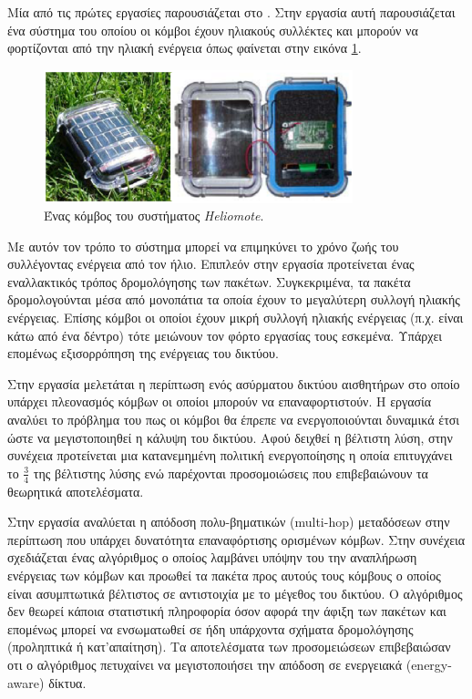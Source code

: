 Μία από τις πρώτες εργασίες παρουσιάζεται στο \cite{heliomote}. Στην εργασία αυτή παρουσιάζεται ένα σύστημα του οποίου οι κόμβοι έχουν ηλιακούς συλλέκτες
και μπορούν να φορτίζονται από την ηλιακή ενέργεια όπως φαίνεται στην εικόνα \ref{fig:heliomote_example}.
\begin{figure}[h]
	\centering
	\includegraphics[width=0.8\textwidth]{images/heliomote_example.eps}
	\caption{Ένας κόμβος του συστήματος \textit{Heliomote}.}
	\label{fig:heliomote_example}
\end{figure}
Με αυτόν τον τρόπο το σύστημα μπορεί να επιμηκύνει το χρόνο ζωής του συλλέγοντας ενέργεια από τον ήλιο. Επιπλεόν στην εργασία προτείνεται ένας εναλλακτικός τρόπος
δρομολόγησης των πακέτων. Συγκεκριμένα, τα πακέτα δρομολογούνται μέσα από μονοπάτια τα οποία έχουν το μεγαλύτερη συλλογή ηλιακής ενέργειας. Επίσης κόμβοι οι οποίοι
έχουν μικρή συλλογή ηλιακής ενέργειας (π.χ. είναι κάτω από ένα δέντρο) τότε μειώνουν τον φόρτο εργασίας τους εσκεμένα. Υπάρχει επομένως εξισορρόπηση της ενέργειας
του δικτύου.

Στην εργασία \cite{harvesting_6} μελετάται η περίπτωση ενός ασύρματου δικτύου αισθητήρων στο οποίο υπάρχει πλεονασμός κόμβων οι οποίοι μπορούν να
επαναφορτιστούν. Η εργασία αναλύει το πρόβλημα του πως οι κόμβοι θα έπρεπε να ενεργοποιούνται δυναμικά έτσι ώστε να μεγιστοποιηθεί η κάλυψη του δικτύου. Αφού δειχθεί
η βέλτιστη λύση, στην συνέχεια προτείνεται μια κατανεμημένη πολιτική ενεργοποίησης η οποία επιτυγχάνει το $\frac{3}{4}$ της βέλτιστης λύσης ενώ παρέχονται
προσομοιώσεις που επιβεβαιώνουν τα θεωρητικά αποτελέσματα.

Στην εργασία \cite{harvesting_7} αναλύεται η απόδοση πολυ-βηματικών (multi-hop) μεταδόσεων στην περίπτωση που υπάρχει δυνατότητα επαναφόρτισης ορισμένων κόμβων. Στην
συνέχεια σχεδιάζεται ένας αλγόριθμος ο οποίος λαμβάνει υπόψην του την αναπλήρωση ενέργειας των κόμβων και προωθεί τα πακέτα προς αυτούς τους κόμβους ο οποίος είναι
ασυμπτωτικά βέλτιστος σε αντιστοιχία με το μέγεθος του δικτύου. Ο αλγόριθμος δεν θεωρεί κάποια στατιστική πληροφορία όσον αφορά την άφιξη των πακέτων και επομένως
μπορεί να ενσωματωθεί σε ήδη υπάρχοντα σχήματα δρομολόγησης (προληπτικά ή κατ'απαίτηση). Τα αποτελέσματα των προσομειώσεων επιβεβαιώσαν οτι ο αλγόριθμος πετυχαίνει
να μεγιστοποιήσει την απόδοση σε ενεργειακά (energy-aware) δίκτυα.

